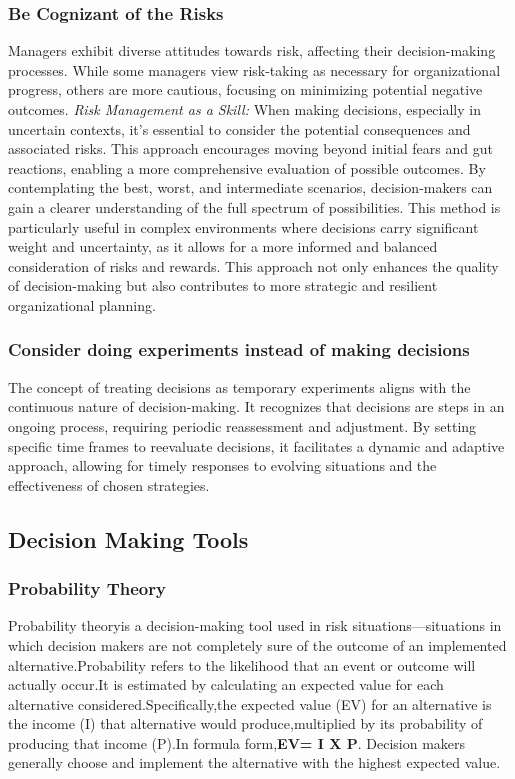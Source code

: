 \documentclass{article}
\begin{document}
\subsubsection{Be Cognizant of the Risks}
Managers exhibit diverse attitudes towards risk, affecting their decision-making processes. While some managers view risk-taking as necessary for organizational progress, others are more cautious, focusing on minimizing potential negative outcomes.\cite{riabacke2006managerial}
\newline
\newline
\textit{Risk Management as a Skill:} When making decisions, especially in uncertain contexts, it's essential to consider the potential consequences and associated risks. This approach encourages moving beyond initial fears and gut reactions, enabling a more comprehensive evaluation of possible outcomes. By contemplating the best, worst, and intermediate scenarios, decision-makers can gain a clearer understanding of the full spectrum of possibilities. This method is particularly useful in complex environments where decisions carry significant weight and uncertainty, as it allows for a more informed and balanced consideration of risks and rewards. This approach not only enhances the quality of decision-making but also contributes to more strategic and resilient organizational planning.

\subsubsection{Consider doing experiments instead of making decisions}
The concept of treating decisions as temporary experiments aligns with the continuous nature of decision-making. It recognizes that decisions are steps in an ongoing process, requiring periodic reassessment and adjustment.\cite{lunenburg2010decision} By setting specific time frames to reevaluate decisions, it facilitates a dynamic and adaptive approach, allowing for timely responses to evolving situations and the effectiveness of chosen strategies.

\subsection{Decision Making Tools}
\subsubsection{Probability Theory}
Probability theoryis a decision-making tool used in risk situations—situations in which decision makers are not completely sure of the outcome of an implemented alternative.Probability refers to the likelihood that an event or outcome will actually occur.It is estimated by calculating an expected value for each alternative considered.Specifically,the expected value (EV) for an alternative is the income (I) that alternative would produce,multiplied by its probability of producing that income (P).In formula form,\textbf{EV= I X P}. Decision makers generally choose and implement the alternative with the highest expected value.\cite{mosier1989expected}
\end{document}
